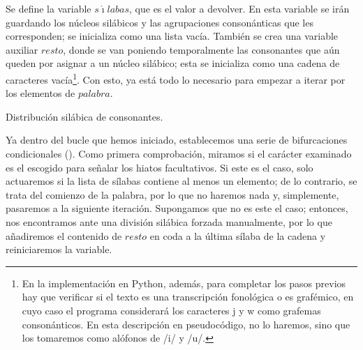 Se define la variable $s\acute{\imath}labas$, que es el valor a devolver. En esta variable se irán guardando los núcleos silábicos y las agrupaciones consonánticas que les corresponden; se inicializa como una lista vacía. También se crea una variable auxiliar $resto$, donde se van poniendo temporalmente las consonantes que aún queden por asignar a un núcleo silábico; esta se inicializa como una cadena de caracteres vacía\footnote{En la implementación en Python, además, para completar los pasos previos hay que verificar si el texto es una transcripción fonológica o es grafémico, en cuyo caso el programa considerará los caracteres \textlangle{}j\textrangle{} y \textlangle{}w\textrangle{} como grafemas consonánticos. En esta descripción en pseudocódigo, no lo haremos, sino que los tomaremos como alófonos de /i/ y /u/.}. Con esto, ya está todo lo necesario para empezar a iterar por los elementos de $palabra$.

\begin{algorithm}[!ht] %
	\caption{Distribución silábica de consonantes.}\label{list:unefonemas}
\end{algorithm}

Ya dentro del bucle que hemos iniciado, establecemos una serie de bifurcaciones condicionales (). Como primera comprobación, miramos si el carácter examinado es el escogido para señalar los hiatos facultativos. Si este es el caso, solo actuaremos si la lista de sílabas contiene al menos un elemento; de lo contrario, se trata del comienzo de la palabra, por lo que no haremos nada y, simplemente, pasaremos a la siguiente iteración. Supongamos que no es este el caso; entonces, nos encontramos ante una división silábica forzada manualmente, por lo que añadiremos el contenido de $resto$ en coda a la última sílaba de la cadena y reiniciaremos la variable.

